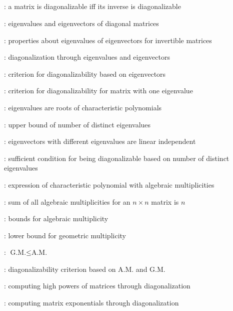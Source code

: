 \subsection*{}
\item {}: a matrix is diagonalizable iff its inverse is diagonalizable
\item {}: eigenvalues and eigenvectors of diagonal matrices
\item {}: properties about eigenvalues of eigenvectors for invertible matrices
\item {}: diagonalization through eigenvalues and eigenvectors
\item {}: criterion for diagonalizability based on eigenvectors
\item {}: criterion for diagonalizability for matrix with one eigenvalue
\item {}: eigenvalues are roots of characteristic polynomials
\item {}: upper bound of number of distinct eigenvalues
\item {}: eigenvectors with different eigenvalues are linear independent
\item {}: sufficient condition for being diagonalizable based on number of distinct eigenvalues
\item {}: expression of characteristic polynomial with algebraic multiplicities
\item {}: sum of all algebraic multiplicities for an \(n\times n\) matrix is \(n\)
\item {}: bounds for algebraic multiplicity
\item {}: lower bound for geometric multiplicity
\item {}: \(\text{G.M.}\leq\text{A.M.}\)
\item {}: diagonalizability criterion based on A.M. and G.M.
\item {}: computing high powers of matrices through diagonalization
\item {}: computing matrix exponentials through diagonalization

